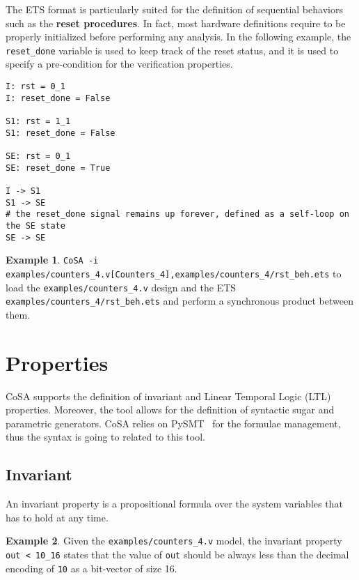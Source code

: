 \documentclass{article}
\theoremstyle{definition}
\newtheorem{example}{Example}[section]
\begin{document}
The ETS format is particularly suited for the definition of sequential
behaviors such as the \textbf{reset procedures}. In fact, most
hardware definitions require to be properly initialized before
performing any analysis. In the following example, the
\texttt{reset\_done} variable is used to keep track of the reset
status, and it is used to specify a pre-condition for the verification
properties.

\begin{lstlisting}[frame=single,language=ets,caption=Reset procedure example,label=reset]
I: rst = 0_1
I: reset_done = False

S1: rst = 1_1
S1: reset_done = False

SE: rst = 0_1
SE: reset_done = True

I -> S1
S1 -> SE
# the reset_done signal remains up forever, defined as a self-loop on the SE state
SE -> SE
\end{lstlisting}

\begin{example}
  \texttt{CoSA -i
    examples/counters\_4.v[Counters\_4],examples/counters\_4/rst\_beh.ets}
  to load the \texttt{examples/counters\_4.v} design and the ETS
  \texttt{examples/counters\_4/rst\_beh.ets} and perform a synchronous
  product between them.
\end{example}

\section{Properties}
\label{sec:properties}

CoSA supports the definition of invariant and Linear Temporal Logic
(LTL) properties. Moreover, the tool allows for the definition of
syntactic sugar and parametric generators. CoSA relies on
PySMT~\cite{gario2015pysmt} for the formulae management, thus the
syntax is going to related to this tool.

\subsection{Invariant}
An invariant property is a propositional formula over the system
variables that has to hold at any time. 

\begin{example}
  Given the \texttt{examples/counters\_4.v} model, the invariant property
  \texttt{out < 10\_16} states that the value of \texttt{out} should
  be always less than the decimal encoding of \texttt{10} as a
  bit-vector of size {16}.
\end{example}
\end{document}
